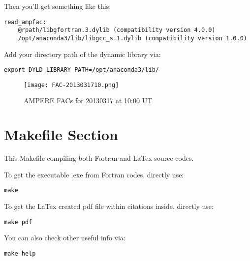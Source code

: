 \documentclass[12pt, letterpaper]{article} %
\begin{document}
\noindent Then you'll get something like this:

\begin{verbatim}
read_ampfac:
	@rpath/libgfortran.3.dylib (compatibility version 4.0.0)
	/opt/anaconda3/lib/libgcc_s.1.dylib (compatibility version 1.0.0)
\end{verbatim} %

\noindent Add your directory path of the dynamic library via:

\begin{verbatim}
export DYLD_LIBRARY_PATH=/opt/anaconda3/lib/
\end{verbatim} %


\begin{figure}[!t] %
\begin{center} %
  \texttt{[image: FAC-2013031710.png]}
  \caption{AMPERE FACs for 20130317 at 10:00 UT}
  \label{fig:1}
\end{center} %
\end{figure} %


\section{Makefile Section} %

\noindent This Makefile compiling both Fortran and LaTex source codes. 

\noindent To get the executable .exe from Fortran codes, directly use:
\begin{verbatim}
make 
\end{verbatim} %


\noindent To get the LaTex created pdf file within citations inside, directly use:
\begin{verbatim}
make pdf
\end{verbatim} %

\noindent You can also check other useful info via:
\begin{verbatim}
make help
\end{verbatim} %
\end{document}
